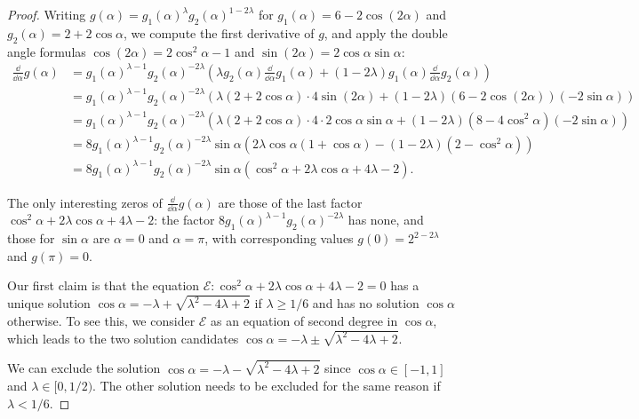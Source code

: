 \documentclass{llncs}
\begin{document}
\begin{proof}
    Writing $g(\alpha)=g_1(\alpha)^{\lambda}g_2(\alpha)^{1-2\lambda}$ for $g_1(\alpha)=6-2\cos(2\alpha)$ and $g_2(\alpha)=2+2\cos\alpha$, we compute the first derivative of $g$, and apply the double angle formulas $\cos(2\alpha)=2\cos^2\alpha-1$ and $\sin(2\alpha)=2\cos\alpha\sin\alpha$:
    \begin{align*}
         \frac{\dd}{\dd\alpha}g(\alpha)&=g_1(\alpha)^{\lambda-1}g_2(\alpha)^{-2\lambda}\left(\lambda g_2(\alpha)\frac{\dd}{\dd\alpha}g_1(\alpha)+(1-2\lambda)g_1(\alpha)\frac{\dd}{\dd\alpha}g_2(\alpha)\right)\\
         &=g_1(\alpha)^{\lambda-1}g_2(\alpha)^{-2\lambda}\left(\lambda(2+2\cos\alpha)\cdot4\sin(2\alpha)+(1-2\lambda)(6-2\cos(2\alpha))(-2\sin\alpha)\right)\\
         &=g_1(\alpha)^{\lambda-1}g_2(\alpha)^{-2\lambda}\left(\lambda(2+2\cos\alpha)\cdot4\cdot2\cos\alpha\sin\alpha+(1-2\lambda)\left(8-4\cos^2\alpha\right)(-2\sin\alpha)\right)\\
         &=8g_1(\alpha)^{\lambda-1}g_2(\alpha)^{-2\lambda}\sin\alpha\left(2\lambda \cos\alpha(1+\cos\alpha)-(1-2\lambda)\left(2-\cos^2\alpha\right)\right)\\
         &=8g_1(\alpha)^{\lambda-1}g_2(\alpha)^{-2\lambda}\sin\alpha\left(\cos^2\alpha+2\lambda\cos\alpha+4\lambda-2\right).
    \end{align*}
    
    The only interesting zeros of $\frac{\dd}{\dd\alpha}g(\alpha)$ are those of the last factor 
    $\cos^2\alpha+2\lambda\cos\alpha+4\lambda-2$: the factor $8g_1(\alpha)^{\lambda-1}g_2(\alpha)^{-2\lambda}$ has none, and those for $\sin\alpha$ are $\alpha=0$ and $\alpha=\pi$, with corresponding values $g(0)=2^{2-2\lambda}$ and $g(\pi)=0$.
    
    Our first claim is that the equation $\mathcal E:\cos^2\alpha+2\lambda\cos\alpha+4\lambda-2=0$ has a unique solution $\cos\alpha=-\lambda+\sqrt{\lambda^2-4\lambda+2}$ if $\lambda\geq 1/6$ and has no solution $\cos\alpha$ otherwise. To see this, we consider $\mathcal E$ as an equation of second degree in $\cos\alpha$, which leads to the two solution candidates $\cos\alpha=-\lambda\pm\sqrt{\lambda^2-4\lambda+2}$.
     
    We can exclude the solution $\cos\alpha=-\lambda-\sqrt{\lambda^2-4\lambda+2}$ since $\cos\alpha\in[-1,1]$ and $\lambda\in [0,1/2)$. 
    The other solution needs to be excluded for the same reason if $\lambda<1/6$.


\end{proof}
\end{document}
